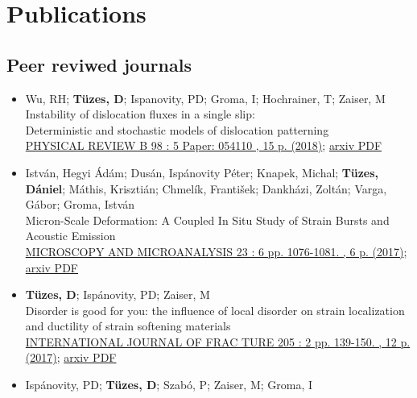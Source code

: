 \documentclass[11pt,a4paper,sans]{moderncv}        %
\begin{document}

\section{Publications}
\subsection{Peer reviwed journals}
\begin{itemize}
\item Wu, RH; \textbf{Tüzes, D}; Ispanovity, PD; Groma, I; Hochrainer, T; Zaiser, M\\
	Instability of dislocation fluxes in a single slip:\\
	Deterministic and stochastic models of dislocation patterning\\
    \href{https://journals.aps.org/prb/abstract/10.1103/PhysRevB.98.054110}{PHYSICAL REVIEW B 98 : 5 Paper: 054110 , 15 p. (2018)};
    \href{https://arxiv.org/pdf/1708.05533}{arxiv PDF}
\item István, Hegyi Ádám; Dusán, Ispánovity Péter; Knapek, Michal; \textbf{Tüzes, Dániel}; Máthis, Krisztián; Chmelík, František; Dankházi, Zoltán; Varga, Gábor; Groma, István\\
    Micron-Scale Deformation: A Coupled In Situ Study of Strain Bursts and Acoustic Emission\\
    \href{https://www.cambridge.org/core/journals/microscopy-and-microanalysis/article/micronscale-deformation-a-coupled-in-situ-study-of-strain-bursts-and-acoustic-emission/DAF84F7E4CC7C2A211E39A1FFBCCB2D0}{MICROSCOPY AND MICROANALYSIS 23 : 6 pp. 1076-1081. , 6 p. (2017)};
    \href{https://arxiv.org/pdf/1604.01815}{arxiv PDF}
\item \textbf{Tüzes, D}; Ispánovity, PD; Zaiser, M\\
    Disorder is good for you: the influence of local disorder on strain localization and ductility of strain softening materials\\
    \href{https://link.springer.com/article/10.1007\%2Fs10704-017-0187-1}{INTERNATIONAL JOURNAL OF FRAC	TURE 205 : 2 pp. 139-150. , 12 p. (2017)};
    \href{https://arxiv.org/pdf/1604.01821}{arxiv PDF}
\item Ispánovity, PD; \textbf{Tüzes, D}; Szabó, P; Zaiser, M; Groma, I\\

\end{itemize}
\end{document}
